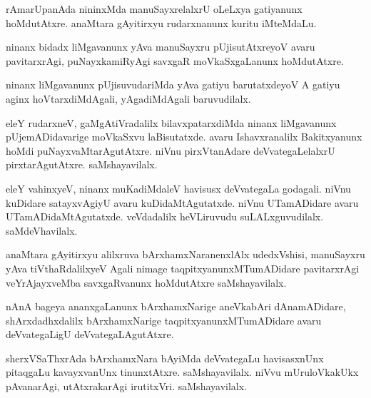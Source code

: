 \documentclass{article}
\begin{document}
\begin{mn}
rAmarUpanAda  nininxMda  manuSayxrelalxrU  oLeLxya  gatiyanunx  hoMdutAtxre.  
anaMtara  gAyitirxyu  rudarxnanunx  kuritu  iMteMdaLu.
\end{mn}

\begin{mn}
ninanx bidadx liMgavanunx yAva  manuSayxru  pUjisutAtxreyoV  avaru  pavitarxrAgi,  
puNayxkamiRyAgi  savxgaR moVkaSxgaLanunx  hoMdutAtxre.
\end{mn}

\begin{mn}
ninanx liMgavanunx  pUjisuvudariMda  yAva  gatiyu  barutatxdeyoV  A  gatiyu  
aginx hoVtarxdiMdAgali, yAgadiMdAgali  baruvudilalx. 
\end{mn}

\begin{mn}
eleY  rudarxneV,  gaMgAtiVradalilx  bilavxpatarxdiMda  ninanx  liMgavanunx  pUjemADidavarige  
moVkaSxvu  laBisutatxde.  avaru  Ishavxranalilx  Bakitxyanunx  hoMdi  puNayxvaMtarAgutAtxre.  
niVnu  pirxVtanAdare  deVvategaLelalxrU  pirxtarAgutAtxre.  saMshayavilalx.
\end{mn}

\begin{mn}
eleY  vahinxyeV,  ninanx  muKadiMdaleV  havisusx  deVvategaLa godagali.  niVnu  kuDidare  
satayxvAgiyU  avaru  kuDidaMtAgutatxde.  niVnu UTamADidare  avaru  UTamADidaMtAgutatxde.  
veVdadalilx  heVLiruvudu  suLALxguvudilalx.  saMdeVhavilalx.
\end{mn}

\begin{mn}
anaMtara  gAyitirxyu  alilxruva  bArxhamxNaranenxlAlx  udedxVshisi,  manuSayxru  
yAva  tiVthaRdalilxyeV  Agali  nimage  taqpitxyanunxMTumADidare  pavitarxrAgi  
veYrAjayxveMba  savxgaRvanunx  hoMdutAtxre  saMshayavilalx.
\end{mn}

\begin{mn}
nAnA bageya  ananxgaLanunx  bArxhamxNarige  aneVkabAri  dAnamADidare,  shArxdadhxdalilx  
bArxhamxNarige  taqpitxyanunxMTumADidare  avaru  deVvategaLigU  deVvategaLAgutAtxre.
\end{mn}

\begin{mn}
sherxVSaThxrAda  bArxhamxNara  bAyiMda  deVvategaLu  havisasxnUnx  pitaqgaLu  
kavayxvanUnx  tinunxtAtxre.  saMshayavilalx.  niVvu  mUruloVkakUkx pAvanarAgi,  
utAtxrakarAgi  irutitxVri.  saMshayavilalx.
\end{mn}
\end{document}
